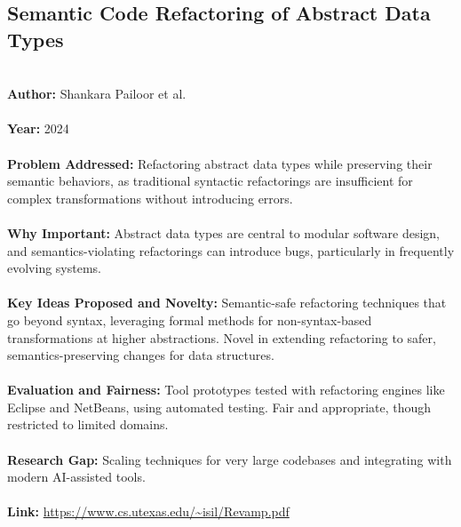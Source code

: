 \documentclass[12pt]{article}
\begin{document}
\subsection*{Semantic Code Refactoring of Abstract Data Types}
\\
\textbf{Author:} Shankara Pailoor et al. \\
\\
\textbf{Year:} 2024 \\
\\
\textbf{Problem Addressed:} Refactoring abstract data types while preserving their semantic behaviors, as traditional syntactic refactorings are insufficient for complex transformations without introducing errors. \\
\\
\textbf{Why Important:} Abstract data types are central to modular software design, and semantics-violating refactorings can introduce bugs, particularly in frequently evolving systems. \\
\\
\textbf{Key Ideas Proposed and Novelty:} Semantic-safe refactoring techniques that go beyond syntax, leveraging formal methods for non-syntax-based transformations at higher abstractions. Novel in extending refactoring to safer, semantics-preserving changes for data structures. \\
\\
\textbf{Evaluation and Fairness:} Tool prototypes tested with refactoring engines like Eclipse and NetBeans, using automated testing. Fair and appropriate, though restricted to limited domains. \\
\\
\textbf{Research Gap:} Scaling techniques for very large codebases and integrating with modern AI-assisted tools. \\
\\
\textbf{Link:} \url{https://www.cs.utexas.edu/~isil/Revamp.pdf}
\end{document}
